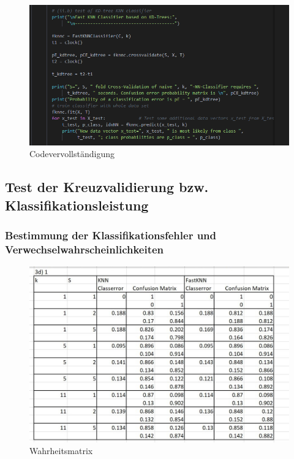  
\begin{figure}[H]
    \centering
    \includegraphics[width=1\linewidth]{files/aufgabe3c5.png}
    \caption{Codevervollständigung}
\end{figure}

\subsection{Test der Kreuzvalidierung bzw. Klassifikationsleistung}

\subsubsection{Bestimmung der Klassifikationsfehler und Verwechselwahrscheinlichkeiten}

\begin{figure}[H]
    \centering
    \includegraphics[width=1\linewidth]{files/aufgabe3d1.jpg}
    \caption{Wahrheitsmatrix}
\end{figure}

